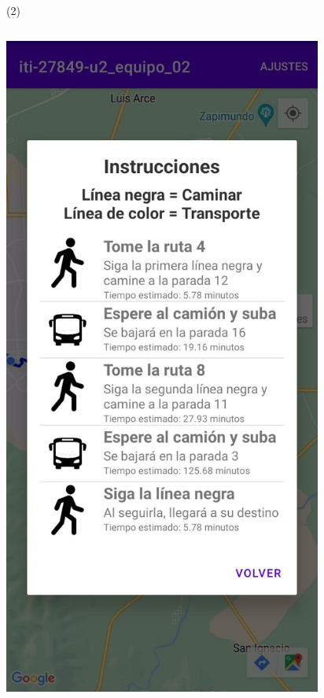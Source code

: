 \begin{frame}{ (2)}
\begin{columns}
\begin{column}{0.25\textwidth}
\includegraphics[width=0.82\textwidth]{2022_MapaVickyRanch/figs/F9}
\end{column}
\begin{column}{0.25\textwidth}  

\end{column}
\end{columns}
\end{frame}
